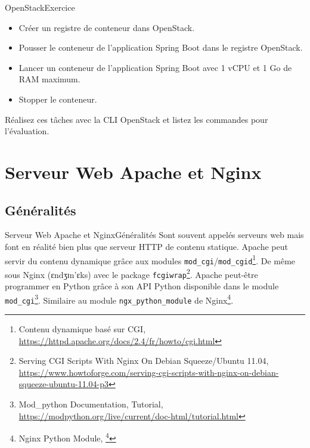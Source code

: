 \documentclass{beamer}
\begin{document}
    \begin{frame}{OpenStack}{Exercice \execcounterdispinc{}}
        \begin{itemize}
            \item Créer un registre de conteneur dans OpenStack.
            \item Pousser le conteneur de l'application Spring Boot dans le registre OpenStack.
            \item Lancer un conteneur de l'application Spring Boot avec 1 vCPU et 1 Go de RAM maximum.
            \item Stopper le conteneur.
        \end{itemize}
        Réalisez ces tâches avec la CLI OpenStack et listez les commandes pour l'évaluation.
    \end{frame}


    \section{Serveur Web Apache et Nginx}\label{sec:serveur-web-apache-et-nginx}

    \subsection{Généralités}\label{subsec:generalites}
    \begin{frame}{Serveur Web Apache et Nginx}{Généralités}
        Sont souvent appelés serveurs web mais font en réalité bien plus que serveur HTTP de contenu statique.
        \bigbreak
        \setlength\parindent{24pt}Apache peut servir du contenu dynamique grâce aux modules \lstinline{mod_cgi}/\lstinline{mod_cgid}\footnote{Contenu dynamique basé sur CGI, \url{https://httpd.apache.org/docs/2.4/fr/howto/cgi.html}}.
        De même sous Nginx (ɛndʒɪn'ɛks) avec le package \lstinline{fcgiwrap}\footnote{Serving CGI Scripts With Nginx On Debian Squeeze/Ubuntu 11.04, \url{https://www.howtoforge.com/serving-cgi-scripts-with-nginx-on-debian-squeeze-ubuntu-11.04-p3}}.
        \bigbreak
        Apache peut-être programmer en Python grâce à son API Python disponible dans le module \lstinline{mod_cgi}\footnote{Mod\_python Documentation, Tutorial, \url{https://modpython.org/live/current/doc-html/tutorial.html}}.
        Similaire au module \lstinline{ngx_python_module} de Nginx\footnote{Nginx Python Module, \footnote{Nginx Python Module, \url{https://github.com/arut/nginx-python-module}}}.
        \setlength\parindent{0pt}
    \end{frame}
\end{document}
